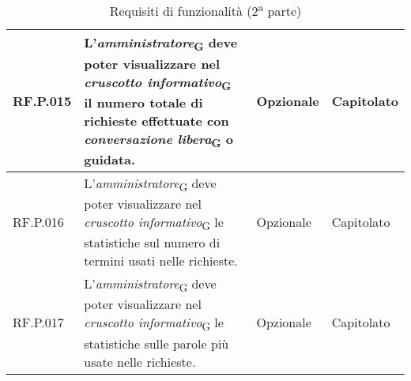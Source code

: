 \begin{table}[H]
\begin{tabular}{|C{2.7cm}|L{7.2cm}|C{2.7cm}|C{2cm}|}
        \hline
        RF.P.015 & L'\textit{amministratore}\textsubscript{G} deve poter visualizzare nel \textit{cruscotto informativo}\textsubscript{G} il numero totale di richieste effettuate con \textit{conversazione libera}\textsubscript{G} o guidata.
         & Opzionale & Capitolato \\
        \hline
        RF.P.016 & L'\textit{amministratore}\textsubscript{G} deve poter visualizzare nel \textit{cruscotto informativo}\textsubscript{G} le statistiche sul numero di termini usati nelle richieste.
         & Opzionale & Capitolato \\
        \hline
        RF.P.017 & L'\textit{amministratore}\textsubscript{G} deve poter visualizzare nel \textit{cruscotto informativo}\textsubscript{G} le statistiche sulle parole più usate nelle richieste.
         & Opzionale & Capitolato \\
        \hline
    \end{tabular}
    \caption{Requisiti di funzionalità  (2\textsuperscript{a} parte)}
\end{table}
